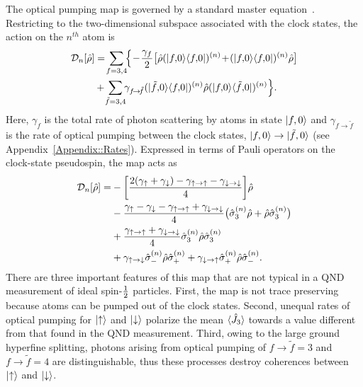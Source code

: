 \documentclass[aps,pra,twocolumn]{revtex4-1} %
\newcommand{\half}{\smallfrac{1}{2}}
\newcommand{\jz}{\hat{J}_3}
\newcommand{\gammauu}{\gamma_{\uparrow \rightarrow \uparrow}}
\newcommand{\gammadd}{\gamma_{\downarrow \rightarrow \downarrow}}
\newcommand{\gammaud}{\gamma_{\uparrow \rightarrow \downarrow}}
\newcommand{\gammadu}{\gamma_{\downarrow \rightarrow \uparrow}}
\newcommand{\gammau}{\gamma_{\uparrow}}
\newcommand{\gammad}{\gamma_{\downarrow}}
\begin{document}
The optical pumping map is governed by a standard master equation~\cite{deutsch_quantum_2010}.  
Restricting to the two-dimensional subspace associated with the clock states, the action on the $n^{th}$ atom is
	\begin{align}
		\mathcal{D}_n[\hat{\rho}] &=  \!\sum_{f=3,4}\!\! \Big\{ \!-\! \frac{\gamma_{f}}{2} \big[ \hat{\rho} (\op{f,\! 0}{f,\! 0})^{(n)} \!+\! (\op{f,\! 0}{f,\! 0})^{(n)}\hat{\rho} \big]\nn\\
		&+\!  \sum_{\tilde{f} =3,4}\!\!  \gamma_{f \!\rightarrow\! \tilde{f}}(\op{\tilde{f},\! 0}{f,\! 0})^{(n)} \hat{\rho}(\op{f,\! 0}{\tilde{f},\! 0})^{(n)} \Big\}.
	\end{align}
Here, $\gamma_{f}$ is the total rate of photon scattering by atoms in state $\lvert{f,0}\rangle$ and  $\gamma_{f \rightarrow \tilde{f} }$ is the rate of optical pumping between the clock states, $\lvert{f,0}\rangle \rightarrow \lvert{\tilde{f},0}\rangle$ (see Appendix~\ref{Appendix::Rates}). Expressed in terms of Pauli operators on the clock-state pseudospin, the map acts as
	\begin{align} \label{Eq::OpticalPumpingMapSchr}
		\mathcal{D}_n [\hat{\rho}] 
				=& - \bigg[ \frac{2(\gammau+ \gammad) - \gammauu - \gammadd}{4} \bigg] \hat{\rho} \nn\\
				&- \frac{ \gammau - \gammad - \gammauu + \gammadd }{4} \big( \hat{\sigma}_3^{(n)} \hat{\rho}+ \hat{\rho} \hat{\sigma}_3^{(n)} \big) \nn \\
		&+ \frac{\gammauu+\gammadd}{4} \hat{\sigma}_ 3^{(n)}\hat{\rho} \hat{\sigma}_3^{(n)} \nn\\
		&+ \gammaud  \hat{\sigma}_-^{(n)} \hat{\rho} \hat{\sigma}_+^{(n)} + \gammadu  \hat{\sigma}_+^{(n)} \hat{\rho} \hat{\sigma}_- ^{(n)}.   
	\end{align} 
There are three important features of this map that are not typical in a QND measurement of ideal spin-$\half$ particles.  
First, the map is not trace preserving because atoms can be pumped out of the clock states. 
Second, unequal rates of optical pumping for $\lvert{\uparrow}\rangle$ and $\lvert{\downarrow}\rangle$ polarize the mean $\expt{\jz}$ towards a value different from that found in the QND measurement. 
Third, owing to the large ground hyperfine splitting, photons arising from optical pumping of $f \rightarrow \tilde{f}=3$ and $f \rightarrow \tilde{f}=4$ are distinguishable, thus these processes destroy coherences between $\lvert{\uparrow}\rangle$ and $\lvert{\downarrow}\rangle$. 
\end{document}
